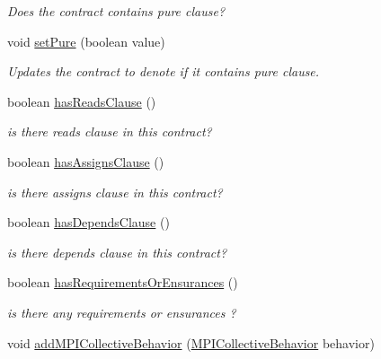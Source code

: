 \begin{DoxyCompactItemize}
\begin{DoxyCompactList}\small\item\em Does the contract contains {\ttfamily pure} clause? \end{DoxyCompactList}\item 
void \hyperlink{classedu_1_1udel_1_1cis_1_1vsl_1_1civl_1_1model_1_1common_1_1contract_1_1CommonFunctionContract_a8f6ca98757e4d8e2912da70b2aa7dc4d}{set\+Pure} (boolean value)
\begin{DoxyCompactList}\small\item\em Updates the contract to denote if it contains {\ttfamily pure} clause. \end{DoxyCompactList}\item 
boolean \hyperlink{classedu_1_1udel_1_1cis_1_1vsl_1_1civl_1_1model_1_1common_1_1contract_1_1CommonFunctionContract_a581f6659ddf4edf0c8568e3796217046}{has\+Reads\+Clause} ()
\begin{DoxyCompactList}\small\item\em is there reads clause in this contract? \end{DoxyCompactList}\item 
boolean \hyperlink{classedu_1_1udel_1_1cis_1_1vsl_1_1civl_1_1model_1_1common_1_1contract_1_1CommonFunctionContract_a5a3fdd45767f9b3038eee0cf4620e81a}{has\+Assigns\+Clause} ()
\begin{DoxyCompactList}\small\item\em is there assigns clause in this contract? \end{DoxyCompactList}\item 
boolean \hyperlink{classedu_1_1udel_1_1cis_1_1vsl_1_1civl_1_1model_1_1common_1_1contract_1_1CommonFunctionContract_a9bec87e3c6cdff9f6d98ded3ced04758}{has\+Depends\+Clause} ()
\begin{DoxyCompactList}\small\item\em is there depends clause in this contract? \end{DoxyCompactList}\item 
boolean \hyperlink{classedu_1_1udel_1_1cis_1_1vsl_1_1civl_1_1model_1_1common_1_1contract_1_1CommonFunctionContract_a40096f0dd009cdd070b25eb88e46af67}{has\+Requirements\+Or\+Ensurances} ()
\begin{DoxyCompactList}\small\item\em is there any requirements or ensurances ? \end{DoxyCompactList}\item 
void \hyperlink{classedu_1_1udel_1_1cis_1_1vsl_1_1civl_1_1model_1_1common_1_1contract_1_1CommonFunctionContract_aa189422d7ec4cf88f3ee5f93e8e7c043}{add\+M\+P\+I\+Collective\+Behavior} (\hyperlink{interfaceedu_1_1udel_1_1cis_1_1vsl_1_1civl_1_1model_1_1IF_1_1contract_1_1MPICollectiveBehavior}{M\+P\+I\+Collective\+Behavior} behavior)

\end{DoxyCompactItemize}
